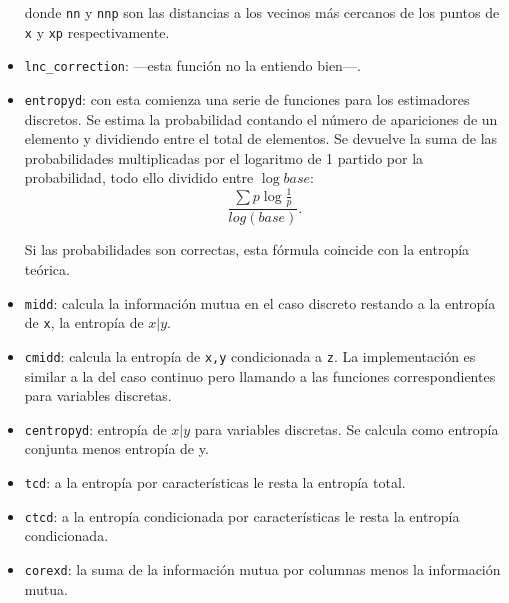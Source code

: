 \documentclass[10pt,a4paper]{article} %
\theoremstyle{definition}
\begin{document}
\begin{itemize}
donde \texttt{nn} y \texttt{nnp} son las distancias a los vecinos más cercanos de los puntos de \texttt{x} y \texttt{xp} respectivamente.

\item \texttt{lnc\_correction}: ---esta función no la entiendo bien---.

\item \texttt{entropyd}: con esta comienza una serie de funciones para los estimadores discretos. Se estima la probabilidad contando el número de apariciones de un elemento y dividiendo entre el total de elementos. Se devuelve la suma de las probabilidades multiplicadas por el logaritmo de 1 partido por la probabilidad, todo ello dividido entre $\log base$:\[
\frac{\sum p \log \frac{1}{p}}{log(base)}.
\]

Si las probabilidades son correctas, esta fórmula coincide con la entropía teórica.

\item \texttt{midd}: calcula la información mutua en el caso discreto restando a la entropía de \texttt{x}, la entropía de $x|y$.

\item \texttt{cmidd}: calcula la entropía de \texttt{x,y} condicionada a \texttt{z}. La implementación es similar a la del caso continuo pero llamando a las funciones correspondientes para variables discretas.

\item \texttt{centropyd}: entropía de $x|y$ para variables discretas. Se calcula como entropía conjunta menos entropía de y.

\item \texttt{tcd}: a la entropía por características le resta la entropía total.

\item \texttt{ctcd}:  a la entropía condicionada por características le resta la entropía condicionada.

\item \texttt{corexd}: la suma de la información mutua por columnas menos la información mutua.


\end{itemize}
\end{document}
